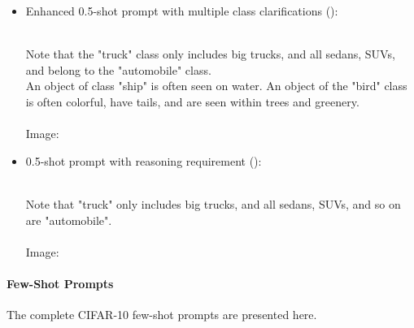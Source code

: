 \documentclass[../ShajiS_RnDReport.tex]{subfiles}
\begin{document}
\begin{itemize}
    \item Enhanced 0.5-shot prompt with multiple class clarifications ():
    \begin{promptbox}
     \\
    Note that the "truck" class only includes big trucks, and all sedans, SUVs, and belong to the "automobile" class. \\
    An object of class "ship" is often seen on water. An object of the "bird" class is often colorful, have tails, and are seen within trees and greenery. \\
     \\
    Image: 
    \end{promptbox}

    \item 0.5-shot prompt with reasoning requirement ():
    \begin{promptbox}
     \\
    Note that "truck" only includes big trucks, and all sedans, SUVs, and so on are "automobile". \\
     \\
    Image: 
    \end{promptbox}
\end{itemize}

\paragraph*{Few-Shot Prompts}
The complete CIFAR-10 few-shot prompts are presented here.
\end{document}
